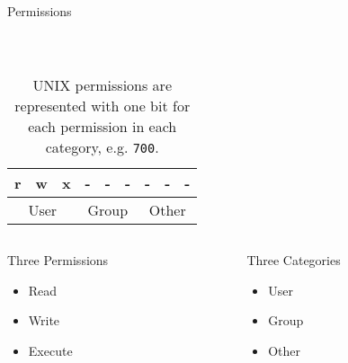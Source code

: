 \documentclass[table,dvipsnames]{beamer}
\begin{document}
\begin{frame}{Permissions}
	\centering
	\begin{columns}
		\begin{column}[T]{0.5\textwidth}
		\begin{table}
			{\tt
			\begin{tabular}{|l|l|l|l|l|l|l|l|l|}
				\hline
				\cellcolor{ForestGreen!25}r& 
				\cellcolor{ForestGreen!25}w& 
				\cellcolor{ForestGreen!25}x&
				\cellcolor{BlueGreen!25}-&
				\cellcolor{BlueGreen!25}-&
				\cellcolor{BlueGreen!25}-&
				\cellcolor{RoyalBlue!25}-&
				\cellcolor{RoyalBlue!25}-&
				\cellcolor{RoyalBlue!25}-\\ \hline
				\multicolumn{3}{|c|}{\cellcolor{ForestGreen!25}User} & 
				\multicolumn{3}{c|}{\cellcolor{BlueGreen!25}Group} & 
				\multicolumn{3}{c|}{\cellcolor{RoyalBlue!25}Other} \\ \hline
			\end{tabular}
			}
			\caption{UNIX permissions are represented with one bit for each
				permission in each category, e.g. \texttt{700}.}
		\end{table}
		\end{column}
	\end{columns}
	\begin{columns}
		\begin{column}[T]{0.3\textwidth}
			\begin{block}{Three Permissions}
				\begin{itemize}
					\item Read 
					\item Write 
					\item Execute
				\end{itemize}
			\end{block}
		\end{column}
		\hspace*{-1cm}
		\hspace*{-1cm}
		\begin{column}[T]{0.3\textwidth}
			\begin{block}{Three Categories}
				\begin{itemize}
					\item User
					\item Group 
					\item Other
				\end{itemize}
			\end{block}
		\end{column}
	\end{columns}
\end{frame}
\end{document}
